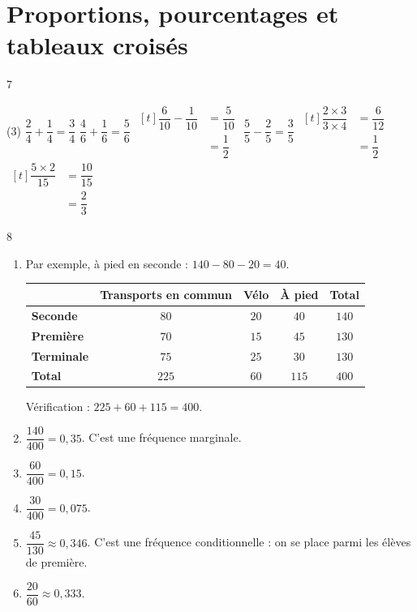 \documentclass[10pt,a4paper]{article}
\begin{document}
\section{Proportions, pourcentages et tableaux croisés}

\begin{corr}{7}
\begin{tasks}[after-item-skip=0.3cm](3)
    \task \(\dfrac{2}{4}+\dfrac{1}{4}=\dfrac{3}{4}\)
    \task \(\dfrac{4}{6}+\dfrac{1}{6}=\dfrac{5}{6}\)
    \task \(\begin{aligned}[t] \dfrac{6}{10}-\dfrac{1}{10}&=\dfrac{5}{10}\\ &=\dfrac{1}{2}\end{aligned}\)
    \task \(\dfrac{5}{5}-\dfrac{2}{5}=\dfrac{3}{5}\)
    \task \(\begin{aligned}[t] \dfrac{2\times 3}{3\times 4}&=\dfrac{6}{12}\\ &=\dfrac{1}{2}\end{aligned}\)
    \task \(\begin{aligned}[t] \dfrac{5\times 2}{15}&=\dfrac{10}{15}\\ &=\dfrac{2}{3}\end{aligned}\)
\end{tasks}
\end{corr}

\begin{corr}[Guidé]{8}
\begin{enumerate}[leftmargin=*]
    \item Par exemple, à pied en seconde : \(140-80-20=40\).
    \begin{center}
    \renewcommand{\arraystretch}{1.5}
    \begin{tabular}{|l|c|c|c|c|}
        \hline
        & \textbf{Transports en commun} & \textbf{Vélo} & \textbf{À pied} & \textbf{Total} \\
        \hline
        \textbf{Seconde} & \(80\) & \(20\) & \(40\) & \(140\) \\
        \hline
        \textbf{Première} & \(70\) & \(15\) & \(45\) & \(130\) \\
        \hline
        \textbf{Terminale} & \(75\) & \(25\) & \(30\) & \(130\) \\
        \hline
        \textbf{Total} & \(225\) & \(60\) & \(115\) & \(400\) \\
        \hline
    \end{tabular}
    \end{center}
    Vérification : \(225+60+115=400\).
    \item \(\dfrac{140}{400}=0,35\). C'est une fréquence marginale.
    \item \(\dfrac{60}{400}=0,15\).
    \item \(\dfrac{30}{400}=0,075\).
    \item \(\dfrac{45}{130}\approx 0,346\). C'est une fréquence conditionnelle : on se place parmi les élèves de première.
    \item \(\dfrac{20}{60}\approx 0,333\).
\end{enumerate}
\end{corr}
\end{document}
